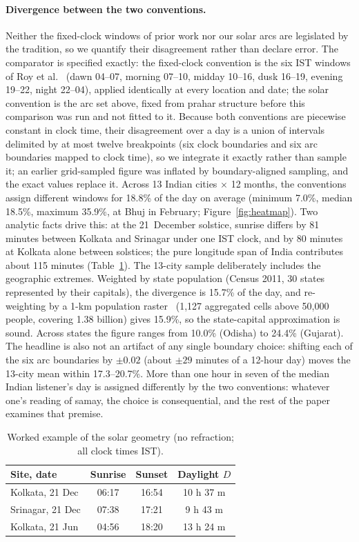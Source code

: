 \documentclass[11pt]{article}
\begin{document}
\paragraph{Divergence between the two conventions.}
Neither the fixed-clock windows of prior work nor our solar arcs are
legislated by the tradition, so we quantify their disagreement rather than
declare error. The comparator is specified exactly: the fixed-clock
convention is the six IST windows of Roy et al.~\cite{roy2017} (dawn
04--07, morning 07--10, midday 10--16, dusk 16--19, evening 19--22, night
22--04), applied identically at every location and date; the solar
convention is the arc set above, fixed from prahar structure before this
comparison was run and not fitted to it. Because both conventions are
piecewise constant in clock time, their disagreement over a day is a union
of intervals delimited by at most twelve breakpoints (six clock boundaries
and six arc boundaries mapped to clock time), so we integrate it exactly
rather than sample it; an earlier grid-sampled figure was inflated by
boundary-aligned sampling, and the exact values replace it. Across 13
Indian cities $\times$ 12 months, the conventions assign different windows
for 18.8\% of the day on average (minimum 7.0\%, median 18.5\%, maximum
35.9\%, at Bhuj in February; Figure~\ref{fig:heatmap}). Two analytic facts
drive this: at the 21~December solstice, sunrise differs by 81 minutes
between Kolkata and Srinagar under one IST clock, and by 80 minutes at
Kolkata alone between solstices; the pure longitude span of India
contributes about 115 minutes (Table~\ref{tab:worked}). The 13-city sample
deliberately includes the geographic extremes. Weighted by state population
(Census 2011, 30 states represented by their capitals), the divergence is
15.7\% of the day, and re-weighting by a 1-km population
raster~\cite{worldpop} (1{,}127 aggregated cells above 50{,}000 people,
covering 1.38 billion) gives 15.9\%, so the state-capital approximation is
sound. Across states the figure ranges from 10.0\% (Odisha) to 24.4\%
(Gujarat). The headline is also not an artifact of any single boundary
choice: shifting each of the six arc boundaries by $\pm 0.02$ (about
$\pm 29$ minutes of a 12-hour day) moves the 13-city mean within
17.3--20.7\%. More than one hour in seven of the median Indian listener's
day is assigned differently by the two conventions: whatever one's reading
of samay, the choice is consequential, and the rest of the paper examines
that premise.

\begin{table}[t]
\centering
\caption{Worked example of the solar geometry (no refraction; all clock
times IST).}
\label{tab:worked}
\begin{tabular}{lccc}
\toprule
Site, date & Sunrise & Sunset & Daylight $D$ \\
\midrule
Kolkata, 21 Dec  & 06:17 & 16:54 & 10 h 37 m \\
Srinagar, 21 Dec & 07:38 & 17:21 & 9 h 43 m  \\
Kolkata, 21 Jun  & 04:56 & 18:20 & 13 h 24 m \\
\bottomrule
\end{tabular}
\end{table}
\end{document}
